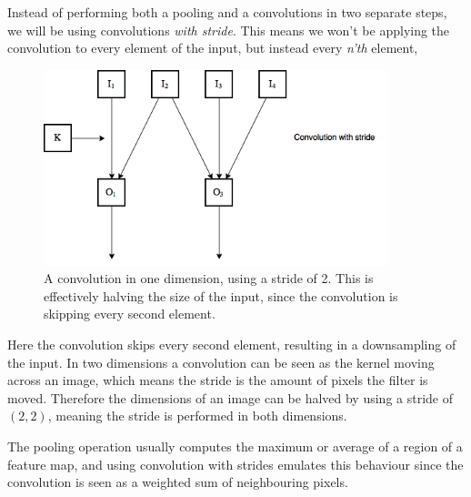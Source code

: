 \documentclass[11pt]{article}
\begin{document}
Instead of performing both a pooling and a convolutions in two separate steps,
we will be using convolutions \textit{with stride}.
This means we won't be applying the convolution to 
every element of the input, but instead every \textit{n'th} element,
\begin{figure}[!h]\label{con2}
    \centering
    \includegraphics[width=10cm]{include/strides.png}
    \caption{A convolution in one dimension, using a stride of 2.
             This is effectively halving the size of the input, since
             the convolution is skipping every second element.}
    \label{fig:conv}
\end{figure}
Here the convolution skips every second element, resulting in a downsampling
of the input.
In two dimensions a convolution can be seen as the kernel moving across
an image, which means the stride is the amount of pixels the filter is moved.
Therefore the dimensions of an image can be halved by using a stride of $(2, 2)$, meaning
the stride is performed in both dimensions.

The pooling operation usually computes the maximum or average of a region of
a feature map, and using convolution with strides emulates
this behaviour since the convolution
is seen as a weighted sum of neighbouring pixels.


\end{document}
